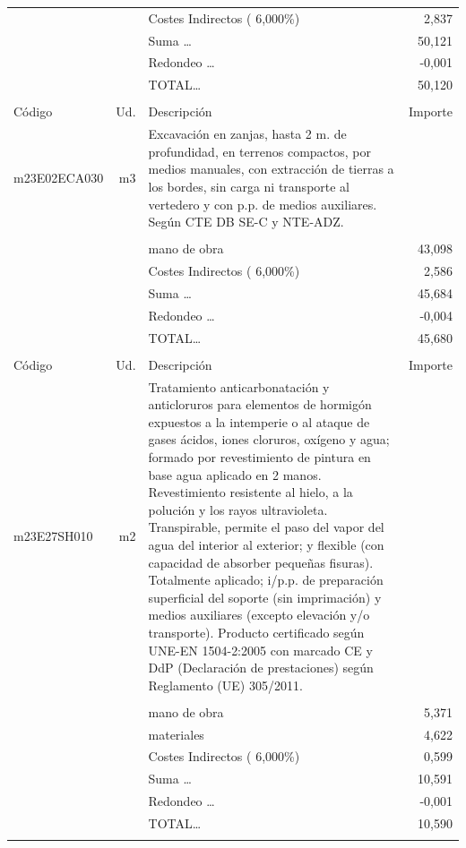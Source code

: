 \documentclass{book}%
\begin{document}
\begin{supertabular}{l r p{60mm} r}
&&Costes Indirectos (     6,000\%)&     2,837\\%
&&Suma \ldots&    50,121\\%
&&Redondeo \ldots&    {-}0,001\\%
%
&&TOTAL\ldots&    50,120\\%
&&&\\%
Código&Ud.&Descripción&Importe\\%
\hline%
m23E02ECA030&m3&Excavación en zanjas, hasta 2 m. de profundidad, en terrenos compactos, por medios manuales, con extracción de tierras a los bordes, sin carga ni transporte al vertedero y con p.p. de medios auxiliares. Según CTE DB SE{-}C y NTE{-}ADZ.&\\%
&&&\\%
&&mano de obra&    43,098\\%
&&Costes Indirectos (     6,000\%)&     2,586\\%
&&Suma \ldots&    45,684\\%
&&Redondeo \ldots&    {-}0,004\\%
%
&&TOTAL\ldots&    45,680\\%
&&&\\%
Código&Ud.&Descripción&Importe\\%
\hline%
m23E27SH010&m2&Tratamiento anticarbonatación y anticloruros para elementos de hormigón expuestos a la intemperie o al ataque de gases ácidos, iones cloruros, oxígeno y agua; formado por revestimiento de pintura en base agua aplicado en 2 manos. Revestimiento resistente al hielo, a la polución y los rayos ultravioleta. Transpirable, permite el paso del vapor del agua del interior al exterior; y flexible (con capacidad de absorber pequeñas fisuras). Totalmente aplicado; i/p.p. de preparación superficial del soporte (sin imprimación) y medios auxiliares (excepto elevación y/o transporte). Producto certificado según UNE{-}EN 1504{-}2:2005 con marcado CE y DdP (Declaración de prestaciones) según Reglamento (UE) 305/2011.&\\%
&&&\\%
&&mano de obra&     5,371\\%
&&materiales&     4,622\\%
&&Costes Indirectos (     6,000\%)&     0,599\\%
&&Suma \ldots&    10,591\\%
&&Redondeo \ldots&    {-}0,001\\%
%
&&TOTAL\ldots&    10,590\\%
&&&\\%

\end{supertabular}
\end{document}
